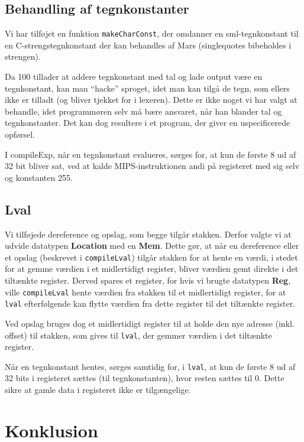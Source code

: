 \documentclass[a4paper, 10pt]{article}
\begin{document}
\subsection{Behandling af tegnkonstanter}
Vi har tilføjet en funktion \texttt{makeCharConst}, der omdanner en
sml-tegnkonstant til en C-strengstegnkonstant der kan behandles af Mars
(singlequotes bibeholdes i strengen).

Da 100 tillader at addere tegnkonstant med tal og lade output være en
tegnkonstant, kan man ``hacke'' sproget, idet man kan tilgå de tegn, som ellers
ikke er tilladt (og bliver tjekket for i lexeren). Dette er ikke noget vi har
valgt at behandle, idet programmøren selv må bære ansvaret, når han blander tal
og tegnkonstanter. Det kan dog resultere i et program, der giver en
uspecificerede opførsel.

I compileExp, når en tegnkonstant evalueres, sørges for, at kun de første 8 ud
af 32 bit bliver sat, ved at kalde MIPS-instruktionen andi på registeret med
sig selv og konstanten 255. 

\subsection{Lval}
Vi tilføjede dereference og opslag, som begge tilgår stakken. Derfor valgte vi
at udvide datatypen \textbf{Location} med en \textbf{Mem}. Dette gør, at når en
dereference eller et opslag (beskrevet i \texttt{compileLval}) tilgår stakken 
for at hente en værdi, i stedet for at gemme værdien i et midlertidigt
register, bliver værdien gemt direkte i det tiltænkte register. Derved spares et
register, for hvis vi brugte datatypen \textbf{Reg}, ville \texttt{compileLval}
hente værdien fra stakken til et midlertidigt register, for at \texttt{lval}
efterfølgende kan flytte værdien fra dette register til det tiltænkte register.

Ved opslag bruges dog et midlertidigt register til at holde den nye adresse
(inkl. offset) til stakken, som gives til \texttt{lval}, der gemmer værdien i
det tiltænkte register.

Når en tegnkonstant hentes, sørges samtidig for, i \texttt{lval}, at kun de
første 8 ud af 32 bits i registeret sættes (til tegnkonstanten), hvor resten
sættes til 0. Dette sikre at gamle data i registeret ikke er tilgængelige.

\section{Konklusion}
\end{document}
